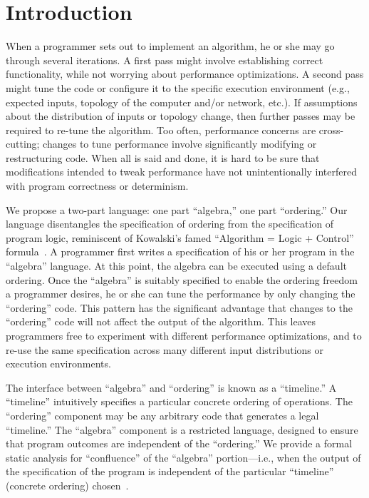 \section{Introduction}
\label{sec:intro}

When a programmer sets out to implement an algorithm, he or she may go through
several iterations.  A first pass might involve establishing correct functionality, while not
worrying about performance optimizations.  A second pass might tune the code or configure it to
the specific execution environment (e.g., expected inputs, topology of the computer and/or network, etc.).  If assumptions about the distribution of inputs or topology change, then further passes may
be required to re-tune the algorithm.  Too often, performance concerns are cross-cutting; changes to
tune performance involve significantly modifying or restructuring code.  When all is said and done,
it is hard to be sure that modifications intended to tweak performance have not unintentionally
interfered with program correctness or determinism.

We propose a two-part language: one part ``algebra,'' one part ``ordering.''  Our language disentangles the specification of ordering from the specification of program logic, reminiscent of Kowalski's famed ``Algorithm = Logic + Control'' formula~\cite{alc}.  A programmer first
writes a specification of his or her program in the ``algebra'' language.  At this point, the algebra
can be executed using a default ordering.
Once the ``algebra'' is suitably specified to enable the ordering freedom a programmer desires, he or she can
tune the performance by only changing the ``ordering'' code.  This pattern has the significant
advantage that changes to the ``ordering'' code will not affect the output of the algorithm.  This
leaves programmers free to experiment with different performance optimizations, and to re-use the
same specification across many different input distributions or execution environments.


The interface between ``algebra'' and ``ordering'' is known as a ``timeline.''  A ``timeline'' intuitively specifies a particular concrete ordering of operations.  The ``ordering'' component may be any arbitrary code that generates a legal ``timeline.''  The ``algebra'' component is a restricted language, designed to ensure that program outcomes are independent of the ``ordering.''  We provide a formal static analysis for ``confluence'' of the ``algebra'' portion---i.e., when the output of the specification of the program is independent of the particular ``timeline'' (concrete ordering) chosen~\cite{this-tr}.


